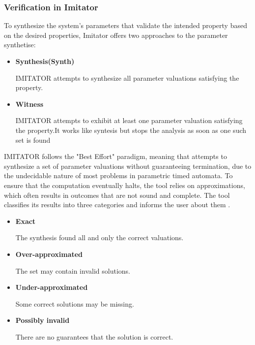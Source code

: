  


\subsubsection*{Verification in Imitator}

To synthesize the system's parameters that validate the intended property based on the desired properties, Imitator offers two approaches to the parameter synthetise\cite{IMITATOR}:

\begin{itemize}
    \item \textbf{Synthesis(Synth)}

    IMITATOR attempts to synthesize all parameter valuations satisfying the property.

    \item \textbf{Witness}

    IMITATOR attempts to exhibit at least one parameter valuation satisfying the property.It works like syntesis but stops the analysis as soon as one such set is found
    
\end{itemize}

IMITATOR follows the "Best Effort" paradigm, meaning that attempts to synthesize a set of parameter valuations without guaranteeing termination, due to the undecidable nature of most problems in parametric timed automata. To ensure that the computation eventually halts, the tool relies on approximations, which often results in outcomes that are not sound and complete. The tool classifies its results into three categories and informs the user about them \cite{imitator_slides}.

\begin{itemize}
    \item \textbf{Exact}

    The synthesis found all and only the correct valuations.

    \item \textbf{Over-approximated}

    The set may contain invalid solutions.

    \item \textbf{Under-approximated}

    Some correct solutions may be missing.

    \item \textbf{Possibly invalid}

    There are no guarantees that the solution is correct.


\end{itemize}

